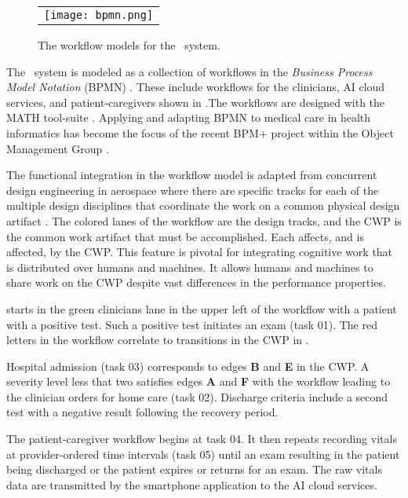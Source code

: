\begin{figure*}[t]
  \begin{center}
    \begin{tabular}{c}
      \texttt{[image: bpmn.png]}
    \end{tabular}
  \end{center}
\caption{The workflow models for the \phware\ system.}
\label{fig:bpmn}
\end{figure*}

The \phware\ system is modeled as a collection of workflows in the \emph{Business Process Model Notation} (BPMN) \cite{BPMNSpecification}. These include workflows for the clinicians, AI cloud services, and patient-caregivers shown in .The workflows are designed with the MATH tool-suite \cite{workflowmodel}. Applying and adapting BPMN to medical care in health informatics has become the focus of the recent BPM+ project within the Object Management Group \cite{bpm}. 

The functional integration in the workflow model is adapted from concurrent design engineering in aerospace where there are specific tracks for each of the multiple design disciplines that coordinate the work on a common physical design artifact \cite{10.1007/978-1-4471-1538-0_9}. The colored lanes of the workflow are the design tracks, and the CWP is the common work artifact that must be accomplished. Each affects, and is affected, by the CWP. This feature is pivotal for integrating cognitive work that is distributed over humans and machines. It allows humans and machines to share work on the CWP despite vast differences in the performance properties. 

 starts in the green clinicians lane in the upper left of the workflow with a patient with a positive test. Such a positive test initiates an exam (task 01). The red letters in the workflow correlate to transitions in the CWP in . 

Hospital admission (task 03) corresponds to edges \textbf{B} and \textbf{E} in the CWP. A severity level less that two satisfies edges \textbf{A} and \textbf{F} with the workflow leading to the clinician orders for home care (task 02). Discharge criteria include a second test with a negative result following the recovery period.

The patient-caregiver workflow begins at task 04. It then repeats recording vitals at provider-ordered time intervals (task 05) until an exam resulting in the patient being discharged or the patient expires or returns for an exam. The raw vitals data are transmitted by the smartphone application to the AI cloud services. 

